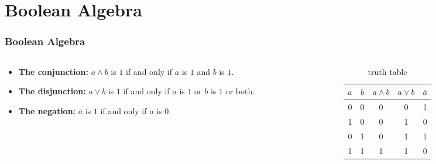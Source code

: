 \documentclass{beamer}
\begin{document}
\section{Boolean Algebra}
\begin{frame}\frametitle{Boolean Algebra}
  \begin{columns}
  \begin{column}{6cm}
  \begin{itemize}
    \item \textbf{The conjunction:} $a\land b$ is $1$ if and only if $a$ is $1$ and $b$ is $1$.\\
    \item \textbf{The disjunction:} $a\lor b$  is $1$ if and only if $a$ is $1$ or $b$ is $1$ or both.\\
    \item \textbf{The negation:}  $\overline{a}$ is $1$ if and only if $a$ is $0$.
  \end{itemize}
  \end{column}
  
    
  \begin{column}{6cm}
  \begin{table}[H]
  \centering
  \begin{tabular}{c|c|c|c|c}
  \textbf{$a$} & \textbf{$b$} & \textbf{$a\land b$} & \textbf{$a\lor b$} & \textbf{$\overline{a}$} \\ \hline
  0          & 0          & 0            & 0            & 1           \\
  1          & 0          & 0            & 1            & 0           \\
  0          & 1          & 0            & 1            & 1           \\
  1          & 1          & 1            & 1            & 0          
  \end{tabular}
  \caption{truth table}
  \label{tab:truth}
  \end{table}
  \end{column}
  
  \end{columns}
\end{frame}
\end{document}
